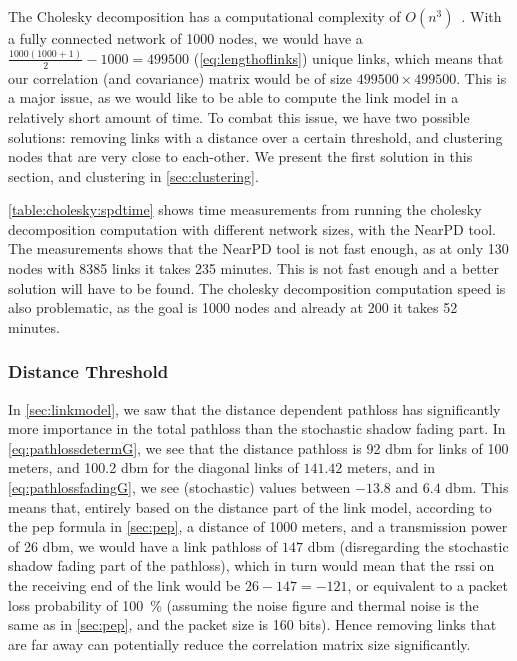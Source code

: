 The Cholesky decomposition has a computational complexity of $O(n^3)$~\citationneeded. With a fully connected network of 1000 nodes, we would have a $\frac{1000(1000+1)}{2} - 1000 = 499500$ (\autoref{eq:lengthoflinks}) unique links, which means that our correlation (and covariance) matrix would be of size $499500 \times 499500$. This is a major issue, as we would like to be able to compute the link model in a relatively short amount of time. To combat this issue, we have two possible solutions: removing links with a distance over a certain threshold, and clustering nodes that are very close to each-other. We present the first solution in this section, and clustering in \autoref{sec:clustering}.\medbreak


\autoref{table:cholesky:spdtime} shows time measurements from running the cholesky decomposition computation with different network sizes, with the NearPD tool. The measurements shows that the NearPD tool is not fast enough, as at only 130 nodes with 8385 links it takes 235 minutes. This is not fast enough and a better solution will have to be found. The cholesky decomposition computation speed is also problematic, as the goal is 1000 nodes and already at 200 it takes 52 minutes.


\subsubsection{Distance Threshold}\label{sec:distancethreshold}
In \autoref{sec:linkmodel}, we saw that the distance dependent \gls{pathloss} has significantly more importance in the total \gls{pathloss} than the stochastic shadow fading part. In \autoref{eq:pathlossdetermG}, we see that the distance \gls{pathloss} is 92 \acrshort{dbm} for links of 100 meters, and 100.2 \acrshort{dbm} for the diagonal links of $141.42$ meters, and in \autoref{eq:pathlossfadingG}, we see (stochastic) values between $-13.8$ and $6.4$ \acrshort{dbm}. This means that, entirely based on the distance part of the link model, according to the \gls{pep} formula in \autoref{sec:pep}, a distance of 1000 meters, and a transmission power of 26 \acrshort{dbm}, we would have a link \gls{pathloss} of $147$ \acrshort{dbm} (disregarding the stochastic shadow fading part of the \gls{pathloss}), which in turn would mean that the \gls{rssi} on the receiving end of the link would be $26 - 147 = -121$, or equivalent to a packet loss probability of 100~\% (assuming the noise figure and thermal noise is the same as in \autoref{sec:pep}, and the packet size is 160 bits). Hence removing links that are far away can potentially reduce the correlation matrix size significantly.

